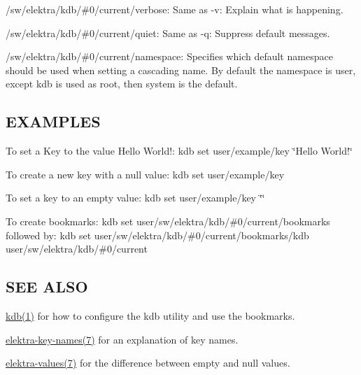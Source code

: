 \begin{DoxyItemize}
\item {\ttfamily /sw/elektra/kdb/\#0/current/verbose}\+: Same as {\ttfamily -\/v}\+: Explain what is happening.
\item {\ttfamily /sw/elektra/kdb/\#0/current/quiet}\+: Same as {\ttfamily -\/q}\+: Suppress default messages.
\item {\ttfamily /sw/elektra/kdb/\#0/current/namespace}\+: Specifies which default namespace should be used when setting a cascading name. By default the namespace is user, except {\ttfamily kdb} is used as root, then {\ttfamily system} is the default.
\end{DoxyItemize}

\subsection*{E\+X\+A\+M\+P\+L\+ES}

To set a Key to the value {\ttfamily Hello World!}\+: {\ttfamily kdb set user/example/key \char`\"{}\+Hello World!\char`\"{}}

To create a new key with a null value\+: {\ttfamily kdb set user/example/key}

To set a key to an empty value\+: {\ttfamily kdb set user/example/key \char`\"{}\char`\"{}}

To create bookmarks\+: {\ttfamily kdb set user/sw/elektra/kdb/\#0/current/bookmarks} followed by\+: {\ttfamily kdb set user/sw/elektra/kdb/\#0/current/bookmarks/kdb user/sw/elektra/kdb/\#0/current}

\subsection*{S\+EE A\+L\+SO}


\begin{DoxyItemize}
\item \hyperlink{md_doc_help_kdb_doc_help_kdb_md}{kdb(1)} for how to configure the kdb utility and use the bookmarks.
\item \hyperlink{md_doc_help_elektra-key-names_doc_help_elektra-key-names_md}{elektra-\/key-\/names(7)} for an explanation of key names.
\item \hyperlink{md_doc_help_elektra-values_doc_help_elektra-values_md}{elektra-\/values(7)} for the difference between empty and null values. 
\end{DoxyItemize}